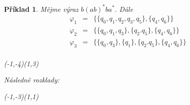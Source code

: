 \documentclass[10pt, a4paper, titlepage]{article}
\theoremstyle{note}
\newtheorem{priklad}{Příklad}
\begin{document}
\begin{priklad}
Mějme v\'yraz $b(ab)^{*}ba^{*}$. D\'ale
\begin{eqnarray*}
\varphi_{1} &=& \lbrace \lbrace q_{0},q_{1},q_{2},q_{3},q_{5} \rbrace, \lbrace q_{4}, q_{6} \rbrace \rbrace \\
\varphi_{2} &=& \lbrace \lbrace q_{0},q_{1},q_{3} \rbrace, \lbrace q_{2}.q_{5} \rbrace, \lbrace q_{4}, q_{6} \rbrace \rbrace \\
\varphi_{3} &=& \lbrace \lbrace q_{0},q_{3} \rbrace, \lbrace q_{1} \rbrace, \lbrace q_{2}.q_{5} \rbrace, \lbrace q_{4}, q_{6} \rbrace \rbrace \\
\end{eqnarray*}
\begin{center}
\begin{VCPicture}{(-1,-4)(1,3)}



\end{VCPicture}
\end{center}

N\'asledně rozklady:
\begin{center}
\begin{VCPicture}{(-1,-3)(1,1)}



\end{VCPicture}


\end{center}
\end{priklad}
\end{document}
